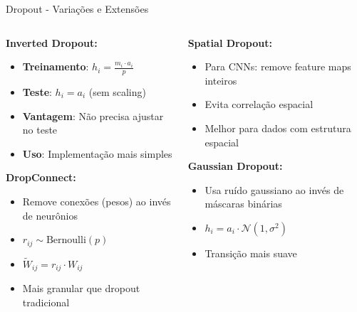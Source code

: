 \documentclass{beamer}
\begin{document}
\begin{frame}{Dropout - Variações e Extensões}
\begin{columns}[T]
\begin{column}{0.48\textwidth}
\textbf{Inverted Dropout:}
\begin{itemize}
    \item \textbf{Treinamento}: $h_i = \frac{m_i \cdot a_i}{p}$
    \item \textbf{Teste}: $h_i = a_i$ (sem scaling)
    \item \textbf{Vantagem}: Não precisa ajustar no teste
    \item \textbf{Uso}: Implementação mais simples
\end{itemize}

\vspace{0.2cm}
\textbf{DropConnect:}
\begin{itemize}
    \item Remove conexões (pesos) ao invés de neurônios
    \item $r_{ij} \sim \text{Bernoulli}(p)$
    \item $\tilde{W}_{ij} = r_{ij} \cdot W_{ij}$
    \item Mais granular que dropout tradicional
\end{itemize}
\end{column}

\begin{column}{0.48\textwidth}
\textbf{Spatial Dropout:}
\begin{itemize}
    \item Para CNNs: remove feature maps inteiros
    \item Evita correlação espacial
    \item Melhor para dados com estrutura espacial
\end{itemize}

\vspace{0.3cm}
\textbf{Gaussian Dropout:}
\begin{itemize}
    \item Usa ruído gaussiano ao invés de máscaras binárias
    \item $h_i = a_i \cdot \mathcal{N}(1, \sigma^2)$
    \item Transição mais suave
\end{itemize}


\end{column}
\end{columns}
\end{frame}
\end{document}
